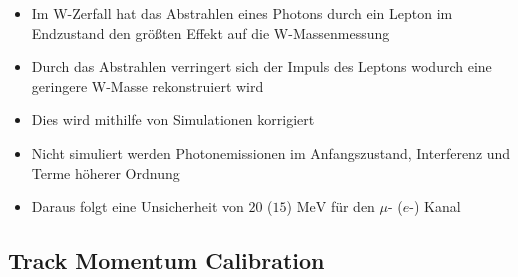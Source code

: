 \documentclass[aspectratio=1610, 9pt]{beamer}
\begin{document}
\begin{frame}
  \begin{itemize}
    \item Im W-Zerfall hat das Abstrahlen eines Photons durch ein Lepton im Endzustand den größten Effekt auf die W-Massenmessung
    \item Durch das Abstrahlen verringert sich der Impuls des Leptons wodurch eine geringere W-Masse rekonstruiert wird
    \item Dies wird mithilfe von Simulationen korrigiert
    \item Nicht simuliert werden Photonemissionen im Anfangszustand, Interferenz und Terme höherer Ordnung
    \item[\rightarrow] Daraus folgt eine Unsicherheit von $\num{20}$ ($\num{15}$) $\si{\MeV}$ für den $\mu$- ($e$-) Kanal

  \end{itemize}
\end{frame}

\subsection{Track Momentum Calibration}
\end{document}
